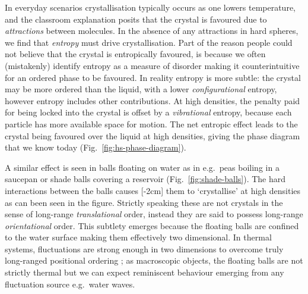 \documentclass[11pt,twoside]{report}
\begin{document}
In everyday scenarios crystallisation typically occurs as one lowers temperature, and the classroom explanation posits that the crystal is favoured due to \emph{attractions} between molecules.
In the absence of any attractions in hard spheres, we find that \emph{entropy} must drive crystallisation.
Part of the reason people could not believe that the crystal is entropically favoured, is because we often (mistakenly) identify entropy as a measure of disorder making it counterintuitive for an ordered phase to be favoured.
In reality entropy is more subtle: the crystal may be more ordered than the liquid, with a lower \emph{configurational} entropy, however entropy includes other contributions.
At high densities, the penalty paid for being locked into the crystal is offset by a \emph{vibrational} entropy, because each particle has more available space for motion.
The net entropic effect leads to the crystal being favoured over the liquid at high densities, giving the phase diagram that we know today (Fig.\ \ref{fig:hs-phase-diagram}).

A similar effect is seen in balls floating on water as in e.g.\ peas boiling in a saucepan or shade balls covering a reservoir (Fig.\ \ref{fig:shade-balls}).
The hard interactions between the balls causes%
[-2cm]
them to `crystallise' at high densities as can been seen in the figure.
Strictly speaking these are not crystals in the sense of long-range \emph{translational} order, instead they are said to possess long-range \emph{orientational} order.
This subtlety emerges because the floating balls are confined to the water surface making them effectively two dimensional.
In thermal systems, fluctuations are strong enough in two dimensions to overcome truly long-ranged positional ordering \cite{MerminPRL1966,MerminPR1968}; as macroscopic objects, the floating balls are not strictly thermal but we can expect reminiscent behaviour emerging from any fluctuation source e.g.\ water waves.
\end{document}
